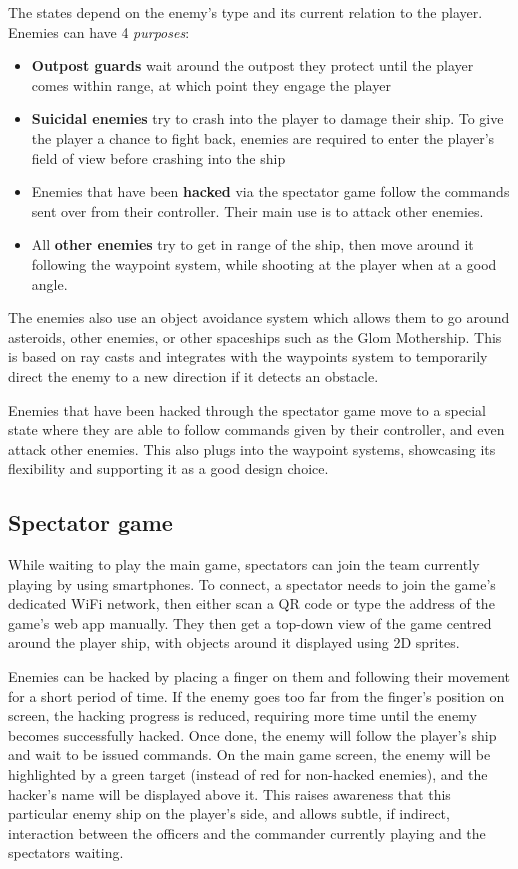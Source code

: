 \documentclass[a4paper,11pt]{article}
\begin{document}
The states depend on the enemy’s type and its current relation to the player. Enemies can have 4 \emph{purposes}:

\begin{itemize}[noitemsep,topsep=.5ex]
	\item \textbf{Outpost guards} wait around the outpost they protect until the player comes within range, at which point they engage the player
	\item \textbf{Suicidal enemies} try to crash into the player to damage their ship. To give the player a chance to fight back, enemies are required to enter the player’s field of view before crashing into the ship
	\item Enemies that have been \textbf{hacked} via the spectator game follow the commands sent over from their controller. Their main use is to attack other enemies.
	\item All \textbf{other enemies} try to get in range of the ship, then move around it following the waypoint system, while shooting at the player when at a good angle.
\end{itemize}

The enemies also use an object avoidance system which allows them to go around asteroids, other enemies, or other spaceships such as the Glom Mothership. This is based on ray casts and integrates with the waypoints system to temporarily direct the enemy to a new direction if it detects an obstacle.

Enemies that have been hacked through the spectator game move to a special state where they are able to follow commands given by their controller, and even attack other enemies. This also plugs into the waypoint systems, showcasing its flexibility and supporting it as a good design choice.

\subsection{Spectator game}
While waiting to play the main game, spectators can join the team currently playing by using smartphones. To connect, a spectator needs to join the game’s dedicated WiFi network, then either scan a QR code or type the address of the game’s web app manually. They then get a top-down view of the game centred around the player ship, with objects around it displayed using 2D sprites.

Enemies can be hacked by placing a finger on them and following their movement for a short period of time. If the enemy goes too far from the finger’s position on screen, the hacking progress is reduced, requiring more time until the enemy becomes successfully hacked. Once done, the enemy will follow the player’s ship and wait to be issued commands. On the main game screen, the enemy will be highlighted by a green target (instead of red for non-hacked enemies), and the hacker’s name will be displayed above it. This raises awareness that this particular enemy ship on the player’s side, and allows subtle, if indirect, interaction between the officers and the commander currently playing and the spectators waiting.
\end{document}
